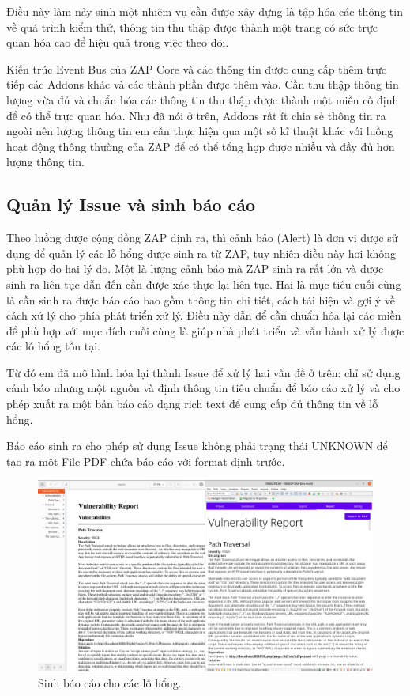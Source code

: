 \documentclass[./../main.tex]{subfiles}
\begin{document}
Điều này làm nảy sinh một nhiệm vụ cần được xây dựng là tập hóa các thông tin về quá trình kiểm thử, thông tin thu thập được thành một trang có sức trực quan hóa cao để hiệu quả trong việc theo dõi.

Kiến trúc Event Bus của ZAP Core và các thông tin được cung cấp thêm trực tiếp các Addons khác và các thành phần được thêm vào. Cần thu thập thông tin lượng vừa đủ và chuẩn hóa các thông tin thu thập được thành một miền cố định để có thể trực quan hóa. Như đã nói ở trên, Addons rất ít chia sẻ thông tin ra ngoài nên lượng thông tin em cần thực hiện qua một số kĩ thuật khác với luồng hoạt động thông thường của ZAP để có thể tổng hợp được nhiều và đầy đủ hơn lượng thông tin.

\subsection{Quản lý Issue và sinh báo cáo}
Theo luồng được cộng đồng ZAP định ra, thì cảnh bảo (Alert) là đơn vị được sử dụng để quản lý các lỗ hổng được sinh ra từ ZAP, tuy nhiên điều này hơi không phù hợp do hai lý do. Một là lượng cảnh báo mà ZAP sinh ra rất lớn và được sinh ra liên tục dẫn đến cần được xác thực lại liên tục. Hai là mục tiêu cuối cùng là cần sinh ra được báo cáo bao gồm thông tin chi tiết, cách tái hiện và gợi ý về cách xử lý cho phía phát triển xử lý. Điều này dẫn để cần chuẩn hóa lại các miền để phù hợp với mục đích cuối cùng là giúp nhà phát triển và vấn hành xử lý được các lỗ hổng tồn tại.

Từ đó em đã mô hình hóa lại thành Issue để xử lý hai vấn đề ở trên: chỉ sử dụng cảnh báo nhưng một nguồn và định thông tin tiêu chuẩn để báo cáo xử lý và cho phép xuất ra một bản báo cáo dạng rich text để cung cấp đủ thông tin về lỗ hổng.

Báo cáo sinh ra cho phép sử dụng Issue không phải trạng thái UNKNOWN để tạo ra một File PDF chứa báo cáo với format định trước.

\begin{figure}[h!]
	\includegraphics[width=\linewidth]{./images/report.png}
	\caption{Sinh báo cáo cho các lỗ hổng.}
	\label{fig:report}
\end{figure}
\end{document}
